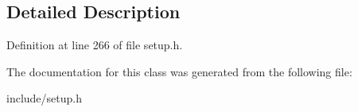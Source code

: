 \subsection{Detailed Description}


Definition at line 266 of file setup.\-h.



The documentation for this class was generated from the following file\-:\begin{DoxyCompactItemize}
\item 
include/setup.\-h\end{DoxyCompactItemize}
